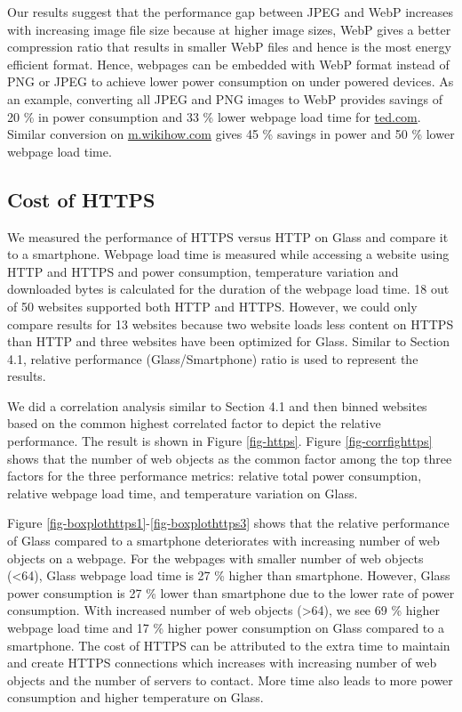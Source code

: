 \documentclass{sig-alternate-10pt}
\begin{document}
Our results suggest that the performance gap between JPEG and WebP increases with increasing image file size because at higher image sizes, WebP gives a better compression ratio that results in smaller  WebP files and hence is the most energy efficient format.  Hence, webpages can be embedded with WebP format instead of PNG or JPEG to achieve lower power consumption on under powered  devices. As an example,  converting all JPEG and PNG  images to WebP   provides savings of 20 \% in power consumption and 33 \% lower  webpage load time for \url{ted.com}. Similar conversion on \url{m.wikihow.com} gives 45 \% savings in power and 50 \% lower   webpage load time.










\subsection{Cost of HTTPS}

We measured the performance of HTTPS versus HTTP on Glass and compare it to a smartphone.  Webpage load time is measured while accessing  a website using HTTP and HTTPS  and  power consumption, temperature variation and downloaded  bytes is calculated  for the duration of the webpage load time. 18  out of 50 websites supported both HTTP and HTTPS.  However, we could only compare results for 13 websites because two website loads less content on HTTPS than HTTP and three websites have been optimized for Glass. Similar to Section 4.1,  relative performance (Glass/Smartphone) ratio is used to represent the results. 









We did a correlation analysis similar to  Section 4.1 and then binned websites based on the common highest correlated factor to depict the relative performance. The result is shown in Figure \ref{fig-https}. Figure  \ref{fig-corrfighttps} shows that   the number of web objects  as the common factor among the top three factors for the three performance metrics: relative total power consumption, relative webpage load time, and temperature variation on Glass. 


 Figure \ref{fig-boxplothttps1}-\ref{fig-boxplothttps3} shows that the relative performance of Glass compared to a smartphone deteriorates with increasing number of web objects on a webpage.  For the webpages with smaller number of web objects (<64), Glass webpage load time is 27 \%  higher than smartphone. However, Glass power consumption is 27 \% lower than smartphone due to the lower rate of power consumption.  With increased number of web objects (>64), we see   69 \% higher webpage load time and 17 \% higher power consumption on Glass compared to a smartphone.    The  cost of HTTPS  can be attributed to the extra time to maintain and create HTTPS connections which  increases  with increasing number of  web objects  and the number of  servers to contact. More time also leads to  more power consumption and  higher  temperature on Glass.
\end{document}
